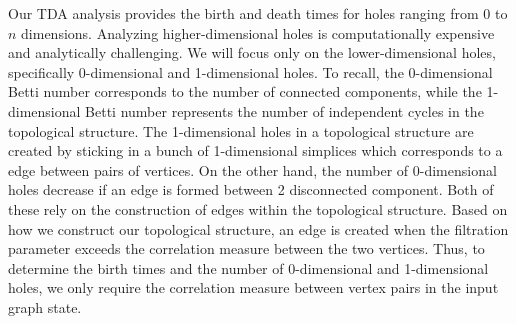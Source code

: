 \documentclass{article}
\begin{document}

Our TDA analysis provides the birth and death times for holes ranging from $0$ to $n$ dimensions. Analyzing higher-dimensional holes is computationally expensive and analytically challenging. We will focus only on the lower-dimensional holes, specifically 0-dimensional and 1-dimensional holes. To recall, the 0-dimensional Betti number corresponds to the number of connected components, while the 1-dimensional Betti number represents the number of independent cycles in the topological structure. The 1-dimensional holes in a topological structure are created by sticking in a bunch of 1-dimensional simplices which corresponds to a edge between pairs of vertices. On the other hand, the number of 0-dimensional holes decrease if an edge is formed between 2 disconnected component.  Both of these rely on the construction of edges within the topological structure. Based on how we construct our topological structure, an edge is created when the filtration parameter exceeds the correlation measure between the two vertices. Thus, to determine the birth times and the number of 0-dimensional and 1-dimensional holes, we only require the correlation measure between vertex pairs in the input graph state.


\end{document}
